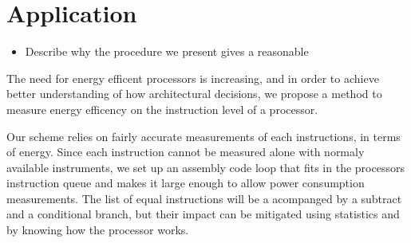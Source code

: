\section{Application}

\begin{itemize}
    \item Describe why the procedure we present gives a reasonable
\end{itemize}


The need for energy efficent processors is increasing, and in order to achieve
better understanding of how architectural decisions, we propose a method to
measure energy efficency on the instruction level of a processor.

Our scheme relies on fairly accurate measurements of each instructions, in terms
of energy. Since each instruction cannot be measured alone with normaly
available instruments, we set up an assembly code loop that fits in the
processors instruction queue and makes it large enough to allow power
consumption measurements. The list of equal instructions will be a acompanged by
a subtract and a conditional branch, but their impact can be mitigated using
statistics and by knowing how the processor works.


